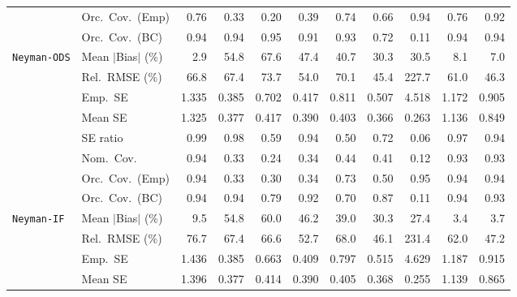 \begin{landscape}
\begin{longtable}{llrrrrrrrrr}
 & Orc.\ Cov.\ (Emp) & \cellcolor{rankthree}0.76 & 0.33 & 0.20 & 0.39 & 0.74 & 0.66 & \cellcolor{rankone}0.94 & \cellcolor{rankthree}0.76 & \cellcolor{ranktwo}0.92 \\
 & Orc.\ Cov.\ (BC) & \cellcolor{ranktwo}0.94 & \cellcolor{ranktwo}0.94 & \cellcolor{rankone}0.95 & 0.91 & \cellcolor{rankthree}0.93 & 0.72 & 0.11 & \cellcolor{ranktwo}0.94 & \cellcolor{ranktwo}0.94 \\
\addlinespace[2pt]
\quad \texttt{Neyman-ODS} & Mean $|$Bias$|$ (\%) & \cellcolor{rankone}2.9 & 54.8 & 67.6 & 47.4 & 40.7 & 30.3 & 30.5 & \cellcolor{rankthree}8.1 & \cellcolor{ranktwo}7.0 \\
 & Rel.\ RMSE (\%) & 66.8 & 67.4 & 73.7 & \cellcolor{rankthree}54.0 & 70.1 & \cellcolor{rankone}45.4 & 227.7 & 61.0 & \cellcolor{ranktwo}46.3 \\
 & Emp.\ SE & 1.335 & 0.385 & 0.702 & 0.417 & 0.811 & 0.507 & 4.518 & 1.172 & 0.905 \\
 & Mean SE & 1.325 & 0.377 & 0.417 & 0.390 & 0.403 & 0.366 & 0.263 & 1.136 & 0.849 \\
 & SE ratio & \cellcolor{rankone}0.99 & \cellcolor{ranktwo}0.98 & 0.59 & 0.94 & 0.50 & 0.72 & 0.06 & \cellcolor{rankthree}0.97 & 0.94 \\
 & Nom.\ Cov. & \cellcolor{rankone}0.94 & 0.33 & 0.24 & 0.34 & \cellcolor{rankthree}0.44 & 0.41 & 0.12 & \cellcolor{ranktwo}0.93 & \cellcolor{ranktwo}0.93 \\
 & Orc.\ Cov.\ (Emp) & \cellcolor{ranktwo}0.94 & 0.33 & 0.30 & 0.34 & \cellcolor{rankthree}0.73 & 0.50 & \cellcolor{rankone}0.95 & \cellcolor{ranktwo}0.94 & \cellcolor{ranktwo}0.94 \\
 & Orc.\ Cov.\ (BC) & \cellcolor{rankone}0.94 & \cellcolor{rankone}0.94 & 0.79 & \cellcolor{rankthree}0.92 & 0.70 & 0.87 & 0.11 & \cellcolor{rankone}0.94 & \cellcolor{ranktwo}0.93 \\
\addlinespace[2pt]
\quad \texttt{Neyman-IF} & Mean $|$Bias$|$ (\%) & \cellcolor{rankthree}9.5 & 54.8 & 60.0 & 46.2 & 39.0 & 30.3 & 27.4 & \cellcolor{rankone}3.4 & \cellcolor{ranktwo}3.7 \\
 & Rel.\ RMSE (\%) & 76.7 & 67.4 & 66.6 & \cellcolor{rankthree}52.7 & 68.0 & \cellcolor{rankone}46.1 & 231.4 & 62.0 & \cellcolor{ranktwo}47.2 \\
 & Emp.\ SE & 1.436 & 0.385 & 0.663 & 0.409 & 0.797 & 0.515 & 4.629 & 1.187 & 0.915 \\
 & Mean SE & 1.396 & 0.377 & 0.414 & 0.390 & 0.405 & 0.368 & 0.255 & 1.139 & 0.865 \\

\end{longtable}
\end{landscape}
